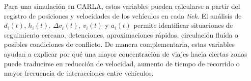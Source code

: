 Para una simulación en CARLA, estas variables pueden calcularse a partir del registro de posiciones y velocidades de los vehículos en cada \textit{tick}. El análisis de \(d_i(t)\), \(h_i(t)\), \(\Delta v_i(t)\), \(v_i(t)\) y \(a_i(t)\) permite identificar situaciones de seguimiento cercano, detenciones, aproximaciones rápidas, circulación fluida o posibles condiciones de conflicto. De manera complementaria, estas variables ayudan a explicar por qué una mayor concentración de viajes hacia ciertas zonas puede traducirse en reducción de velocidad, aumento de tiempo de recorrido o mayor frecuencia de interacciones entre vehículos.

